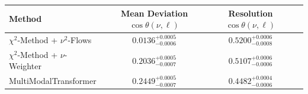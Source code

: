     \begin{tabular}{lccc}
        \toprule
        Method & Mean Deviation $\cos\theta(\nu, \ell)$ & Resolution $\cos\theta(\nu, \ell)$ \\
        \midrule
        $\chi^2$-Method + $\nu^2$-Flows & $0.0136^{+0.0005}_{-0.0006}$ & $0.5200^{+0.0006}_{-0.0008}$ \\
        $\chi^2$-Method + $\nu$-Weighter & $0.2036^{+0.0005}_{-0.0007}$ & $0.5107^{+0.0006}_{-0.0006}$ \\
        MultiModalTransformer & $0.2449^{+0.0005}_{-0.0007}$ & $0.4482^{+0.0004}_{-0.0006}$ \\
        \bottomrule
    \end{tabular}